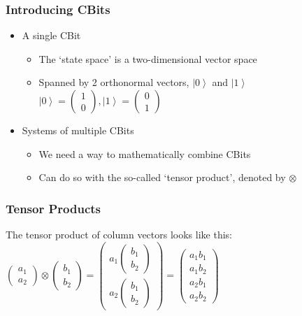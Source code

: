 \documentclass{beamer}
\newcommand{\ket}[1]{\left|{#1}\right\rangle}
\newcommand{\zvec}{\ket{0}}
\newcommand{\ovec}{\ket{1}}
\begin{document}
  \begin{frame}
    \frametitle{Introducing CBits}
    \begin{itemize}
      \item{A single CBit}
        \begin{itemize}
          \item{The `state space' is a two-dimensional vector space}
          \item{Spanned by 2 orthonormal vectors, $\zvec$ and $\ovec$} 
          $\zvec = \begin{pmatrix}1\\0\end{pmatrix},
           \ovec = \begin{pmatrix}0\\1\end{pmatrix}$
        \end{itemize}
    \end{itemize}
    \begin{itemize}
      \item{Systems of multiple CBits}
        \begin{itemize}
          \item{We need a way to mathematically combine CBits}
          \item{Can do so with the so-called `tensor product', denoted by $\otimes$} 
        \end{itemize}
    \end{itemize}
  \end{frame}

  \begin{frame}
    \frametitle{Tensor Products}

    The tensor product of column vectors looks like this: \\

    $\begin{pmatrix}a_{1}\\a_{2}\end{pmatrix} \otimes \begin{pmatrix}b_{1}\\b_{2}\end{pmatrix} = 
     \begin{pmatrix}a_{1}\begin{pmatrix}b_{1}\\b_{2}\end{pmatrix} \\ 
        a_{2}\begin{pmatrix}b_{1}\\b_{2}\end{pmatrix}\end{pmatrix} = 
     \begin{pmatrix}a_{1}b_{1}\\a_{1}b_{2}\\a_{2}b_{1}\\a_{2}b_{2}\end{pmatrix} $
  \end{frame}
\end{document}
